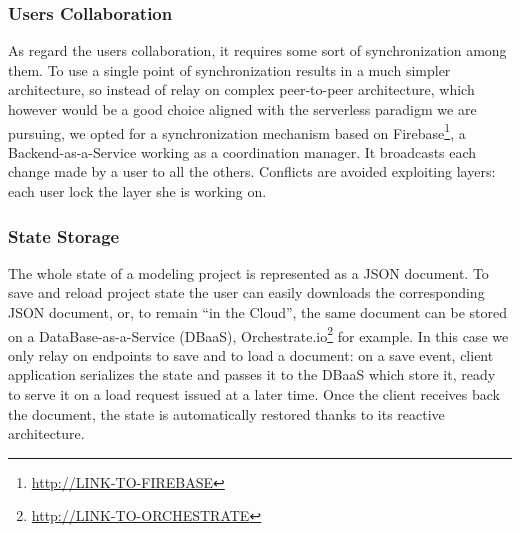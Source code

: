 \subsubsection*{Users Collaboration}

As regard the users collaboration, it requires some sort of synchronization among them. To use a single point of synchronization results in a much simpler architecture, so instead of relay on complex peer-to-peer architecture, which however would be a good choice aligned with the serverless paradigm we are pursuing, we opted for a synchronization mechanism based on Firebase\footnote{\url{http://LINK-TO-FIREBASE}}, a Backend-as-a-Service working as a coordination manager. It broadcasts each change made by a user to all the others. Conflicts are avoided exploiting layers: each user lock the layer she is working on.

\subsubsection*{State Storage}


The whole state of a modeling project is represented as a JSON document. To save and reload project state the user can easily downloads the corresponding JSON document, or, to remain ``in the Cloud'', the same document can be stored on a DataBase-as-a-Service (DBaaS), Orchestrate.io\footnote{\url{http://LINK-TO-ORCHESTRATE}} for example. In this case we only relay on endpoints to save and to load a document: on a save event,  client application serializes the state and passes it to the DBaaS which store it, ready to serve it on a load request issued at a later time. Once the client receives back the document, the state is automatically restored thanks to its reactive architecture. 


